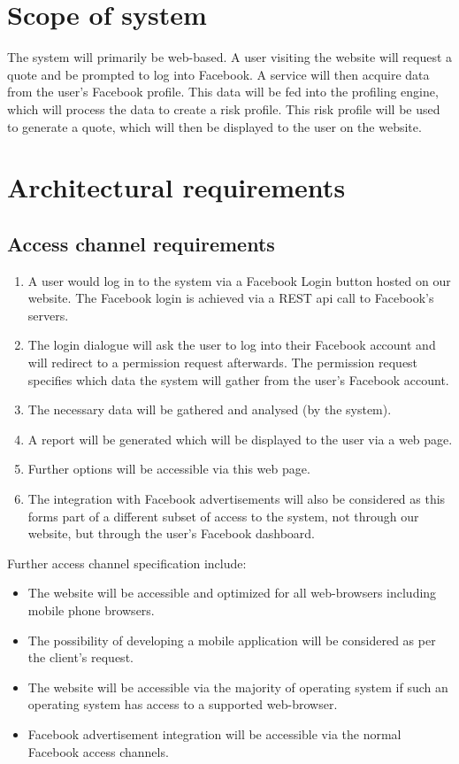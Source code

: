\documentclass{article}
\begin{document}
\section{Scope of system}
The system will primarily be web-based. A user visiting the website will request a quote and be prompted to log into Facebook. A service will then acquire data from the user’s Facebook profile. This data will be fed into the profiling engine, which will process the data to create a risk profile. This risk profile will be used to generate a quote, which will then be displayed to the user on the website.

\section{Architectural requirements}
	\subsection{Access channel requirements}
	\begin{enumerate}
		\item A user would log in to the system via a Facebook Login button hosted on our website. The Facebook login is achieved via a REST api call to Facebook's servers.
		\item The login dialogue will ask the user to log into their Facebook account and will redirect to a permission request afterwards. The permission request specifies which data the system will gather from the user's Facebook account.
		\item The necessary data will be gathered and analysed (by the system).
		\item A report will be generated which will be displayed to the user via a web page.
		\item Further options will be accessible via this web page. 
		\item The integration with Facebook advertisements will also be considered as this forms part of a different subset of access to the system, not through our website, but through the user's Facebook dashboard.
	\end{enumerate}
	Further access channel specification include:
	\begin{itemize}
		\item The website will be accessible and optimized for all web-browsers including mobile phone browsers.
		\item The possibility of developing a mobile application will be considered as per the client's request.
		\item The website will be accessible via the majority of operating system if such an operating system has access to a supported web-browser.
		\item Facebook advertisement integration will be accessible via the normal Facebook access channels.
	\end{itemize}
	 
\end{document}
